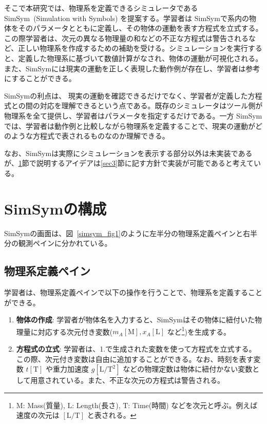 \documentclass[11pt, a4paper, oneside, twocolumn, dvipdfmx]{jsarticle}
\newcommand{\simname}{SimSym}
\newcommand{\simnamealt}{Simulation with Symbols}
\begin{document}
そこで本研究では、物理系を定義できるシミュレータである \simname~(\simnamealt) を提案する。学習者は \simname で系内の物体をそのパラメータとともに定義し、その物体の運動を表す方程式を立式する。この際学習者は、次元の異なる物理量の和などの不正な方程式は警告されるなど、正しい物理系を作成するための補助を受ける。シミュレーションを実行すると、定義した物理系に基づいて数値計算がなされ、物体の運動が可視化される。また、\simname には現実の運動を正しく表現した動作例が存在し、学習者は参考にすることができる。

\simname の利点は、
現実の運動を確認できるだけでなく、学習者が定義した方程式との間の対応を理解できるという点である。既存のシミュレータはツール側が物理系を全て提供し、学習者はパラメータを指定するだけである。一方 \simname では、学習者は動作例と比較しながら物理系を定義することで、現実の運動がどのような方程式で表されるものなのか理解できる。

なお、\simname は実際にシミュレーションを表示する部分以外は未実装であるが、\ref{sec2}節で説明するアイデアは\ref{sec3}節に記す方針で実装が可能であると考えている。

\section{\simname の構成} \label{sec2}

\simname の画面は、図~\ref{simsym_fig1}のように左半分の物理系定義ペインと右半分の観測ペインに分かれている。

\subsection*{物理系定義ペイン}

学習者は、物理系定義ペインで以下の操作を行うことで、物理系を定義することができる。

\begin{enumerate}
\item \textbf{物体の作成}: 学習者が物体名を入力すると、\simname はその物体に紐付いた物理量に対応する次元付き変数($m_A\mathrm{[M]}, x_A\mathrm{[L]}$ など\footnote{$\mathrm{M}$: Mass(質量), $\mathrm{L}$: Length(長さ), $\mathrm{T}$: Time(時間) などを次元と呼ぶ。例えば速度の次元は $\mathrm{[L/T]}$ と表される。})を生成する。
\item \textbf{方程式の立式}: 学習者は、1.で生成された変数を使って方程式を立式する。この際、次元付き変数は自由に追加することができる。なお、時刻を表す変数 $t\mathrm{[T]}$ や重力加速度 $g\mathrm{[L/T^2]}$ などの物理定数は物体に紐付かない変数として用意されている。また、不正な次元の方程式は警告される。
\end{enumerate}
\end{document}
